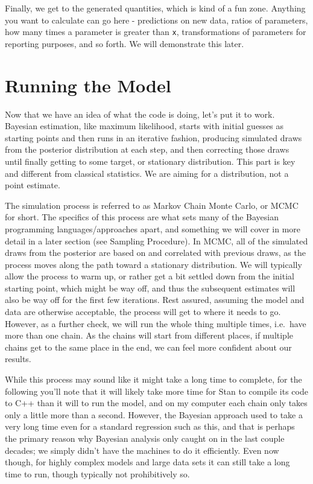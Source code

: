 \documentclass[]{book}
\begin{document}
Finally, we get to the generated quantities, which is kind of a fun zone. Anything you want to calculate can go here - predictions on new data, ratios of parameters, how many times a parameter is greater than \texttt{x}, transformations of parameters for reporting purposes, and so forth. We will demonstrate this later.

\hypertarget{running-the-model}{%
\section{Running the Model}\label{running-the-model}}

Now that we have an idea of what the code is doing, let's put it to work. Bayesian estimation, like maximum likelihood, starts with initial guesses as starting points and then runs in an iterative fashion, producing simulated draws from the posterior distribution at each step, and then correcting those draws until finally getting to some target, or stationary distribution. This part is key and different from classical statistics. We are aiming for a distribution, not a point estimate.

The simulation process is referred to as Markov Chain Monte Carlo, or MCMC for short. The specifics of this process are what sets many of the Bayesian programming languages/approaches apart, and something we will cover in more detail in a later section (see Sampling Procedure). In MCMC, all of the simulated draws from the posterior are based on and correlated with previous draws, as the process moves along the path toward a stationary distribution. We will typically allow the process to warm up, or rather get a bit settled down from the initial starting point, which might be way off, and thus the subsequent estimates will also be way off for the first few iterations. Rest assured, assuming the model and data are otherwise acceptable, the process will get to where it needs to go. However, as a further check, we will run the whole thing multiple times, i.e.~have more than one chain. As the chains will start from different places, if multiple chains get to the same place in the end, we can feel more confident about our results.

While this process may sound like it might take a long time to complete, for the following you'll note that it will likely take more time for Stan to compile its code to C++ than it will to run the model, and on my computer each chain only takes only a little more than a second. However, the Bayesian approach used to take a very long time even for a standard regression such as this, and that is perhaps the primary reason why Bayesian analysis only caught on in the last couple decades; we simply didn't have the machines to do it efficiently. Even now though, for highly complex models and large data sets it can still take a long time to run, though typically not prohibitively so.
\end{document}
